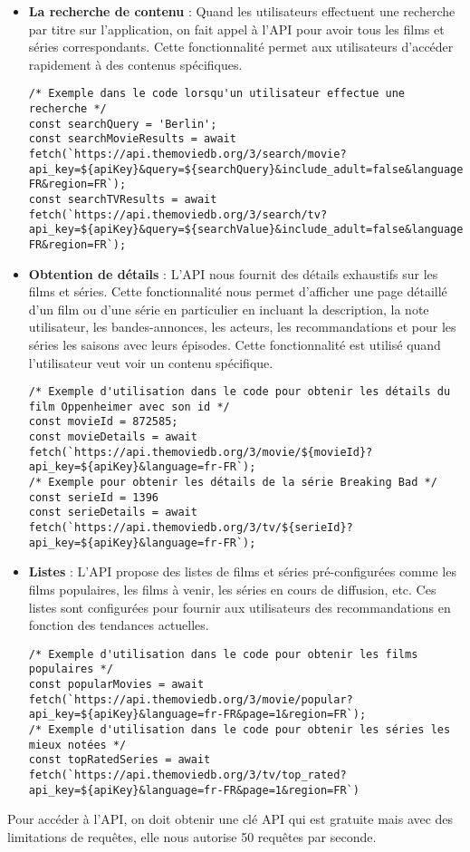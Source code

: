 \documentclass[a4paper]{article}
\begin{document}
\begin{itemize}
    \item \textbf{La recherche de contenu} : Quand les utilisateurs effectuent une recherche par titre sur l'application, on fait appel à l'API pour avoir tous les films et séries correspondants. Cette fonctionnalité permet aux utilisateurs d'accéder rapidement à des contenus spécifiques. \newline 
    \begin{lstlisting}
/* Exemple dans le code lorsqu'un utilisateur effectue une recherche */
const searchQuery = 'Berlin';
const searchMovieResults = await fetch(`https://api.themoviedb.org/3/search/movie?api_key=${apiKey}&query=${searchQuery}&include_adult=false&language=fr-FR&region=FR`);
const searchTVResults = await fetch(`https://api.themoviedb.org/3/search/tv?api_key=${apiKey}&query=${searchValue}&include_adult=false&language=fr-FR&region=FR`); 
    \end{lstlisting} 
    \item \textbf {Obtention de détails} : L'API nous fournit des détails exhaustifs sur les films et séries. Cette fonctionnalité nous permet d'afficher une page détaillé d'un film ou d'une série en particulier en incluant la description, la note utilisateur, les bandes-annonces, les acteurs, les recommandations et pour les séries les saisons avec leurs épisodes. Cette fonctionnalité est utilisé quand l'utilisateur veut voir un contenu spécifique. \newline
    \begin{lstlisting}
/* Exemple d'utilisation dans le code pour obtenir les détails du film Oppenheimer avec son id */
const movieId = 872585;
const movieDetails = await fetch(`https://api.themoviedb.org/3/movie/${movieId}?api_key=${apiKey}&language=fr-FR`);
/* Exemple pour obtenir les détails de la série Breaking Bad */
const serieId = 1396
const serieDetails = await fetch(`https://api.themoviedb.org/3/tv/${serieId}?api_key=${apiKey}&language=fr-FR`);
    \end{lstlisting}
    \item \textbf{Listes} : L'API propose des listes de films et séries pré-configurées comme les films populaires, les films à venir, les séries en cours de diffusion, etc. Ces listes sont configurées pour fournir aux utilisateurs des recommandations en fonction des tendances actuelles.\newline 
    \begin{lstlisting}
/* Exemple d'utilisation dans le code pour obtenir les films populaires */
const popularMovies = await fetch(`https://api.themoviedb.org/3/movie/popular?api_key=${apiKey}&language=fr-FR&page=1&region=FR`);
/* Exemple d'utilisation dans le code pour obtenir les séries les mieux notées */
const topRatedSeries = await fetch(`https://api.themoviedb.org/3/tv/top_rated?api_key=${apiKey}&language=fr-FR&page=1&region=FR`)
    \end{lstlisting}
\end{itemize}
\newpage
Pour accéder à l'API, on doit obtenir une clé API qui est gratuite mais avec des limitations de requêtes, elle nous autorise 50 requêtes par seconde. \\
\end{document}
